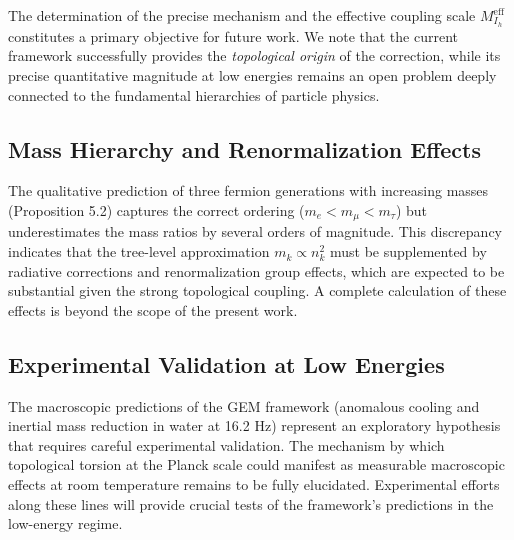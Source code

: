 The determination of the precise mechanism and the effective coupling scale $M_{I_h}^{\text{eff}}$ constitutes a primary objective for future work. We note that the current framework successfully provides the \textit{topological origin} of the correction, while its precise quantitative magnitude at low energies remains an open problem deeply connected to the fundamental hierarchies of particle physics.

\subsection{Mass Hierarchy and Renormalization Effects}
\label{subsec:mass_hierarchy}

The qualitative prediction of three fermion generations with increasing masses (Proposition 5.2) captures the correct ordering ($m_e < m_\mu < m_\tau$) but underestimates the mass ratios by several orders of magnitude. This discrepancy indicates that the tree-level approximation $m_k \propto n_k^2$ must be supplemented by radiative corrections and renormalization group effects, which are expected to be substantial given the strong topological coupling. A complete calculation of these effects is beyond the scope of the present work.

\subsection{Experimental Validation at Low Energies}
\label{subsec:experimental_validation}

The macroscopic predictions of the GEM framework (anomalous cooling and inertial mass reduction in water at 16.2 Hz) represent an exploratory hypothesis that requires careful experimental validation. The mechanism by which topological torsion at the Planck scale could manifest as measurable macroscopic effects at room temperature remains to be fully elucidated. Experimental efforts along these lines will provide crucial tests of the framework's predictions in the low-energy regime.